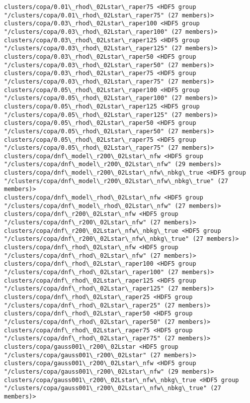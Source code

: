 \documentclass[11pt]{article}
\begin{document}
\begin{Verbatim}[commandchars=\\\{\}]
clusters/copa/0.01\_rhod\_02Lstar\_raper75 <HDF5 group "/clusters/copa/0.01\_rhod\_02Lstar\_raper75" (27 members)>
clusters/copa/0.03\_rhod\_02Lstar\_raper100 <HDF5 group "/clusters/copa/0.03\_rhod\_02Lstar\_raper100" (27 members)>
clusters/copa/0.03\_rhod\_02Lstar\_raper125 <HDF5 group "/clusters/copa/0.03\_rhod\_02Lstar\_raper125" (27 members)>
clusters/copa/0.03\_rhod\_02Lstar\_raper50 <HDF5 group "/clusters/copa/0.03\_rhod\_02Lstar\_raper50" (27 members)>
clusters/copa/0.03\_rhod\_02Lstar\_raper75 <HDF5 group "/clusters/copa/0.03\_rhod\_02Lstar\_raper75" (27 members)>
clusters/copa/0.05\_rhod\_02Lstar\_raper100 <HDF5 group "/clusters/copa/0.05\_rhod\_02Lstar\_raper100" (27 members)>
clusters/copa/0.05\_rhod\_02Lstar\_raper125 <HDF5 group "/clusters/copa/0.05\_rhod\_02Lstar\_raper125" (27 members)>
clusters/copa/0.05\_rhod\_02Lstar\_raper50 <HDF5 group "/clusters/copa/0.05\_rhod\_02Lstar\_raper50" (27 members)>
clusters/copa/0.05\_rhod\_02Lstar\_raper75 <HDF5 group "/clusters/copa/0.05\_rhod\_02Lstar\_raper75" (27 members)>
clusters/copa/dnf\_model\_r200\_02Lstar\_nfw <HDF5 group "/clusters/copa/dnf\_model\_r200\_02Lstar\_nfw" (29 members)>
clusters/copa/dnf\_model\_r200\_02Lstar\_nfw\_nbkg\_true <HDF5 group "/clusters/copa/dnf\_model\_r200\_02Lstar\_nfw\_nbkg\_true" (27 members)>
clusters/copa/dnf\_model\_rhod\_02Lstar\_nfw <HDF5 group "/clusters/copa/dnf\_model\_rhod\_02Lstar\_nfw" (27 members)>
clusters/copa/dnf\_r200\_02Lstar\_nfw <HDF5 group "/clusters/copa/dnf\_r200\_02Lstar\_nfw" (27 members)>
clusters/copa/dnf\_r200\_02Lstar\_nfw\_nbkg\_true <HDF5 group "/clusters/copa/dnf\_r200\_02Lstar\_nfw\_nbkg\_true" (27 members)>
clusters/copa/dnf\_rhod\_02Lstar\_nfw <HDF5 group "/clusters/copa/dnf\_rhod\_02Lstar\_nfw" (27 members)>
clusters/copa/dnf\_rhod\_02Lstar\_raper100 <HDF5 group "/clusters/copa/dnf\_rhod\_02Lstar\_raper100" (27 members)>
clusters/copa/dnf\_rhod\_02Lstar\_raper125 <HDF5 group "/clusters/copa/dnf\_rhod\_02Lstar\_raper125" (27 members)>
clusters/copa/dnf\_rhod\_02Lstar\_raper25 <HDF5 group "/clusters/copa/dnf\_rhod\_02Lstar\_raper25" (27 members)>
clusters/copa/dnf\_rhod\_02Lstar\_raper50 <HDF5 group "/clusters/copa/dnf\_rhod\_02Lstar\_raper50" (27 members)>
clusters/copa/dnf\_rhod\_02Lstar\_raper75 <HDF5 group "/clusters/copa/dnf\_rhod\_02Lstar\_raper75" (27 members)>
clusters/copa/gauss001\_r200\_02Lstar <HDF5 group "/clusters/copa/gauss001\_r200\_02Lstar" (27 members)>
clusters/copa/gauss001\_r200\_02Lstar\_nfw <HDF5 group "/clusters/copa/gauss001\_r200\_02Lstar\_nfw" (29 members)>
clusters/copa/gauss001\_r200\_02Lstar\_nfw\_nbkg\_true <HDF5 group "/clusters/copa/gauss001\_r200\_02Lstar\_nfw\_nbkg\_true" (27 members)>

\end{Verbatim}
\end{document}
